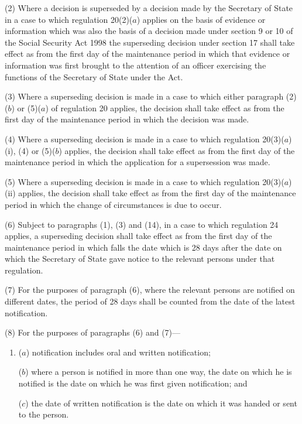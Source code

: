 \documentclass[a4paper,12pt]{article}
\begin{document}
(2) Where a decision is superseded by a decision made by the Secretary of State in a case to which regulation 20(2)($a$) applies on the basis of evidence or information which was also the basis of a decision made under section 9 or 10 of the Social Security Act 1998 the superseding decision under section 17 shall take effect as from the first day of the maintenance period in which that evidence or information was first brought to the attention of an officer exercising the functions of the Secretary of State under the Act.

(3) Where a superseding decision is made in a case to which either paragraph (2)($b$) or (5)($a$) of regulation 20 applies, the decision shall take effect as from the first day of the maintenance period in which the decision was made.

(4) Where a superseding decision is made in a case to which regulation 20(3)($a$)(i), (4) or (5)($b$) applies, the decision shall take effect as from the first day of the maintenance period in which the application for a supersession was made.

(5) Where a superseding decision is made in a case to which regulation 20(3)($a$)(ii) applies, the decision shall take effect as from the first day of the maintenance period in which the change of circumstances is due to occur.

(6) Subject to paragraphs (1), (3) and (14), in a case to which regulation 24 applies, a superseding decision shall take effect as from the first day of the maintenance period in which falls the date which is 28 days after the date on which the Secretary of State gave notice to the relevant persons under that regulation.

(7) For the purposes of paragraph (6), where the relevant persons are notified on different dates, the period of 28 days shall be counted from the date of the latest notification.

(8) For the purposes of paragraphs (6) and (7)---
\begin{enumerate}\item[]
($a$) notification includes oral and written notification;

($b$) where a person is notified in more than one way, the date on which he is notified is the date on which he was first given notification; and

($c$) the date of written notification is the date on which it was handed or sent to the person.
\end{enumerate}
\end{document}
